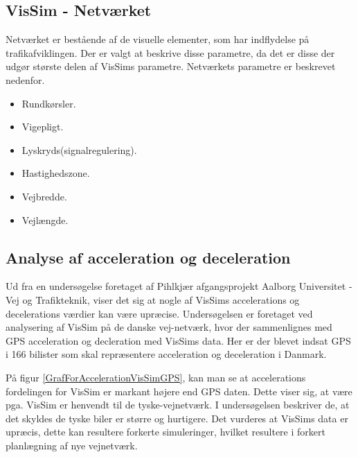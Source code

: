 \subsection{VisSim - Netværket}
Netværket er bestående af de visuelle elementer, som har indflydelse på trafikafviklingen. Der er valgt at beskrive disse parametre, da det er disse der udgør største delen af VisSims parametre.
Netværkets parametre er beskrevet nedenfor.

\begin{itemize}
\item Rundkørsler.
\item Vigepligt.
\item Lyskryds(signalregulering).
\item Hastighedszone.
\item Vejbredde.
\item Vejlængde.
\end{itemize}

\subsection{Analyse af acceleration og deceleration}
Ud fra en undersøgelse foretaget af Pihlkjær afgangsprojekt Aalborg Universitet - Vej og Trafikteknik, viser det sig at nogle af VisSims accelerations og decelerations værdier kan være upræcise. Undersøgelsen er foretaget ved analysering af VisSim på de danske vej-netværk, hvor der sammenlignes med GPS acceleration og decleration med VisSims data. Her er der blevet indsat GPS i 166 bilister som skal repræsentere acceleration og deceleration i Danmark.

På figur \ref{GrafForAccelerationVisSimGPS}, kan man se at accelerations fordelingen for VisSim er markant højere end GPS daten. Dette viser sig, at være pga. VisSim er henvendt til de tyske-vejnetværk. I undersøgelsen beskriver de, at det skyldes de tyske biler er større og hurtigere. Det vurderes at VisSims data er upræcis, dette kan resultere forkerte simuleringer, hvilket resultere i forkert planlægning af nye vejnetværk. \cite{TrafiksimuleringVisSim}

